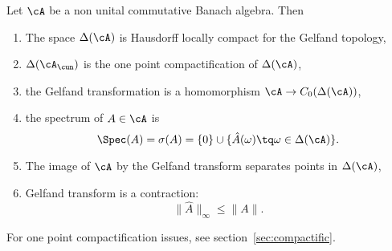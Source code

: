 \begin{theorem}
Let $\cA$ be a non unital commutative  Banach algebra. Then

\begin{enumerate}
\item \label{enuhi} The space $\Delta(\cA)$ is Hausdorff locally compact for the Gelfand topology,
\item \label{enuhii} $\Delta(\cA_{\cun})$ is the one point compactification of $\Delta(\cA)$,
\item \label{enuhiii} the Gelfand transformation is a homomorphism $\cA\to C_0(\Delta(\cA))$,
\item \label{enuhiv} the spectrum of $A\in\cA$ is
\[
  \Spec(A)=\sigma(A)=\{0\}\cup\{\hat A(\omega)\tq\omega\in\Delta(\cA)\}.
\]
\item \label{enuhv} The image of $\cA$ by the Gelfand transform separates points in $\Delta(\cA)$,
\item \label{enuhvi} Gelfand transform is a contraction:
\[
\|\hat A\|_{\infty}\leq\|A\|.
\]

\end{enumerate}

\end{theorem}

For one point compactification issues, see section~\ref{sec:compactific}.

